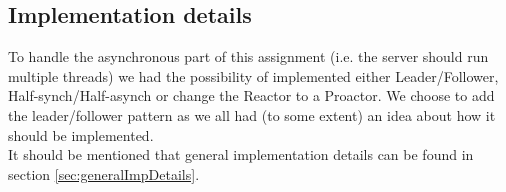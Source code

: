 \documentclass[Main]{subfiles}
\begin{document}
\subsection{Implementation details}
To handle the asynchronous part of this assignment (i.e. the server should run multiple threads) we had the possibility of implemented either Leader/Follower, Half-synch/Half-asynch or change the Reactor to a Proactor. We choose to add the leader/follower pattern as we all had (to some extent) an idea about how it should be implemented. \\
It should be mentioned that general implementation details can be found in section \ref{sec:generalImpDetails}.
\end{document}
